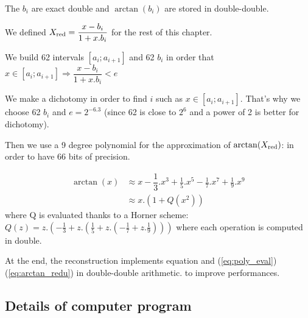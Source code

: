 The $b_i$ are exact double and $\arctan(b_i)$ are stored in
double-double.

We defined $X_{\mathrm{red}} = \dfrac{x-b_i}{1+x.b_i}$ for the rest of this chapter.

We build 62 intervals $[a_i;a_{i+1}]$ and 62 $b_i$ in order that $ x \in
[a_i;a_{i+1}] \Rightarrow \dfrac{x-b_i}{1+x.b_i} < e$

We make a dichotomy in order to find $i$ such as $ x \in [a_i;a_{i+1}]
$. That's why we choose 62 $b_i$ and $e=2^{-6.3}$ (since 62 is close to
$2^6$ and a power of 2 is better for dichotomy).

Then we use a 9 degree polynomial for the approximation of $\arctan(X_{\mathrm{red}})$:
in order to have 66 bits of precision.

\begin{equation}
\begin{split} \arctan(x)& \approx x - \dfrac{1}{3} .x^3 + \frac{1}{5}.x^5
- \frac{1}{7}.x^7 + \frac{1}{9}.x^9 \\ \label{eq:poly_eval}
  & \approx x . ( 1 + Q(x^2))
\end{split}
\end{equation}
where 
Q is evaluated thanks to a Horner scheme:
$ Q(z) = z. (-\frac{1}{3} + z.(\frac{1}{5} + z.(-\frac{1}{7} +
z.\frac{1}{9}))) $
where each operation is computed in double.

At the end, the reconstruction implements equation and (\ref{eq:poly_eval})  
(\ref{eq:arctan_redu}) in double-double
arithmetic.
 to improve performances.



\subsection{Details of computer program}
  
